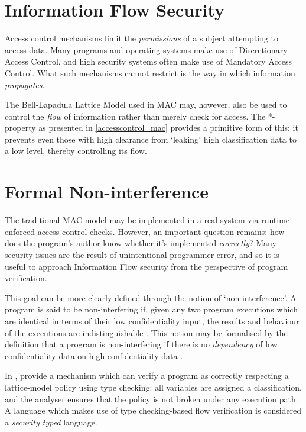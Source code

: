 \section{Information Flow Security}

Access control mechanisms limit the \textit{permissions} of a subject attempting to access data. Many programs and operating systems make use of Discretionary Access Control, and high security systems often make use of Mandatory Access Control. What such mechanisms cannot restrict is the way in which information \textit{propagates}.

The Bell-Lapadula Lattice Model used in MAC may, however, also be used to control the \textit{flow} of information rather than merely check for access. The *-property as presented in \ref{accesscontrol_mac} provides a primitive form of this: it prevents even those with high clearance from `leaking' high classification data to a low level, thereby controlling its flow.

\section{Formal Non-interference} \label{theory_if_noninterference}

The traditional MAC model may be implemented in a real system via runtime-enforced access control checks. However, an important question remains: how does the program's author know whether it's implemented \textit{correctly}? Many security issues are the result of unintentional programmer error, and so it is useful to approach Information Flow security from the perspective of program verification.

This goal can be more clearly defined through the notion of `non-interference'. A program is said to be non-interfering if, given any two program executions which are identical in terms of their low confidentiality input, the results and behaviour of the executions are indistinguishable \cite{sabelfeld2003if}. This notion may be formalised by the definition that a program is non-interfering if there is no \textit{dependency} of low confidentiality data on high confidentiality data \cite{cohen1977declassification}.

In , \citeauthor{denning1977certification} \cite{denning1977certification} provide a mechanism which can verify a program as correctly respecting a lattice-model policy using type checking: all variables are assigned a classification, and the analyser ensures that the policy is not broken under any execution path. A language which makes use of type checking-based flow verification is considered a \textit{security typed} language.

